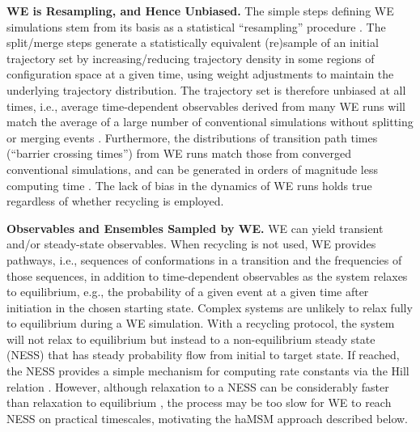 \textbf{WE is Resampling, and Hence Unbiased.} The simple steps defining WE simulations stem from its basis as a statistical “resampling” procedure \citep{zhang_exact_2010}. 
The split/merge steps generate a statistically equivalent (re)sample of an initial trajectory set by increasing/reducing trajectory density in some regions of configuration space at a given time, using weight adjustments to maintain the underlying trajectory distribution. 
The trajectory set is therefore unbiased at all times, i.e., average time-dependent observables derived from many WE runs will match the average of a large number of conventional simulations without splitting or merging events \citep{zhang_exact_2010}. 
Furthermore, the distributions of transition path times (“barrier crossing times”) from WE runs match those from converged conventional simulations, and can be generated in orders of magnitude less computing time \citep{zwier_efficient_2011, zheng_simulating_2007}. 
The lack of bias in the dynamics of WE runs holds true regardless of whether recycling is employed.

\textbf{Observables and Ensembles Sampled by WE.} WE can yield transient and/or steady-state observables. 
When recycling is not used, WE provides pathways, i.e., sequences of conformations in a transition and the frequencies of those sequences, in addition to time-dependent observables as the system relaxes to equilibrium, e.g., the probability of a given event at a given time after initiation in the chosen starting state.
Complex systems are unlikely to relax fully to equilibrium during a WE simulation. 
With a recycling protocol, the system will not relax to equilibrium but instead to a non-equilibrium steady state (NESS) that has steady probability flow from initial to target state. 
If reached, the NESS provides a simple mechanism for computing rate constants via the Hill relation \citep{bhatt_steady-state_2010}. 
However, although relaxation to a NESS can be considerably faster than relaxation to equilibrium \citep{copperman_transient_2019,zuckerman_discrete-state_nodate}, the process may be too slow for WE to reach NESS on practical timescales, motivating the haMSM approach \citep{adhikari_computational_2019,copperman_accelerated_2020} described below.

